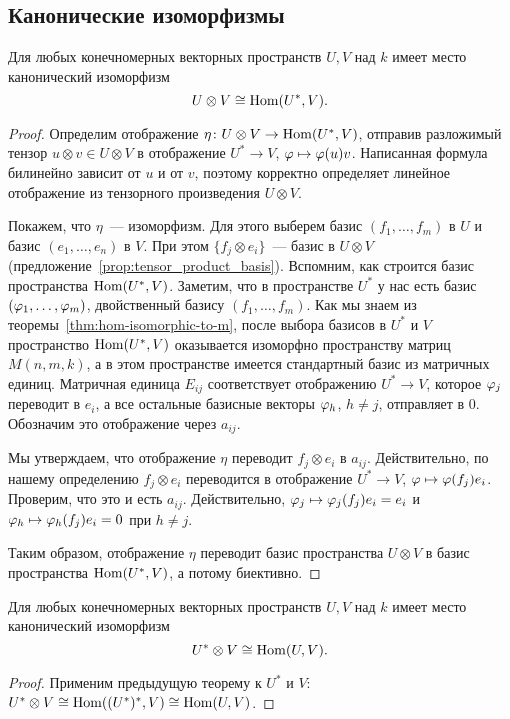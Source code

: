 \subsection{Канонические изоморфизмы}


\begin{theorem}\label{thm:hom_and_otimes}
Для любых конечномерных векторных пространств $U,V$ над $k$ имеет
место канонический изоморфизм
$$
U\otimes V\cong\operatorname{Hom}(U^*,V).
$$ 
\end{theorem}
\begin{proof}
Определим отображение $\eta\colon U\otimes V\to\operatorname{Hom}(U^*,V)$, отправив
разложимый тензор $u\otimes v\in U\otimes V$ в
отображение $U^*\to V$, $\varphi\mapsto\varphi(u)v$. Написанная формула
билинейно зависит от $u$ и от $v$, поэтому корректно определяет
линейное отображение из тензорного произведения $U\otimes V$.

Покажем, что $\eta$~--- изоморфизм. Для этого выберем базис
$(f_1,\dots,f_m)$ в $U$ и базис $(e_1,\dots,e_n)$ в $V$.
При этом $\{f_j\otimes e_i\}$~--- базис в $U\otimes V$
(предложение~\ref{prop:tensor_product_basis}).
Вспомним, как строится базис пространства $\operatorname{Hom}(U^*,V)$.
Заметим, что в пространстве $U^*$ у нас есть базис
$(\varphi_1,\dots,\varphi_m)$, двойственный базису $(f_1,\dots,f_m)$.
Как мы знаем из теоремы~\ref{thm:hom-isomorphic-to-m},
после выбора базисов в $U^*$ и $V$ пространство $\operatorname{Hom}(U^*,V)$
оказывается изоморфно пространству матриц $M(n,m,k)$,
а в этом пространстве имеется стандартный базис из матричных
единиц. Матричная единица $E_{ij}$ соответствует отображению
$U^*\to V$, которое $\varphi_j$ переводит в $e_i$, а все остальные
базисные векторы $\varphi_h$, $h\neq j$, отправляет в $0$. Обозначим это
отображение через $a_{ij}$.

Мы утверждаем, что отображение $\eta$ переводит $f_j\otimes e_i$ в
$a_{ij}$.
Действительно, по нашему определению $f_j\otimes e_i$ переводится
в отображение $U^*\to V$, $\varphi\mapsto\varphi(f_j)e_i$. Проверим, что это и
есть $a_{ij}$. Действительно, $\varphi_j\mapsto\varphi_j(f_j)e_i = e_i$
и $\varphi_h\mapsto\varphi_h(f_j)e_i = 0$ при $h\neq j$.

Таким образом, отображение $\eta$ переводит базис пространства
$U\otimes V$ в базис пространства $\operatorname{Hom}(U^*,V)$, а потому биективно.
\end{proof}

\begin{corollary}\label{cor:hom_and_otimes_2}
Для любых конечномерных векторных пространств $U,V$ над $k$ имеет
место канонический изоморфизм
$$
U^*\otimes V\cong\operatorname{Hom}(U,V).
$$
\end{corollary}
\begin{proof}
Применим предыдущую теорему к $U^*$ и $V$:
$U^*\otimes V \cong \operatorname{Hom}((U^*)^*,V) \cong \operatorname{Hom}(U,V)$.
\end{proof}

